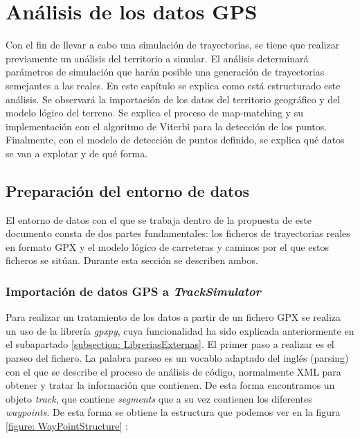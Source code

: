\chapter{Análisis de los datos \ac{GPS}} 
Con el fin de llevar a cabo una simulación de trayectorias, se tiene que realizar previamente
un análisis del territorio a simular. El análisis determinará parámetros de simulación que 
harán posible una generación de trayectorias semejantes a las reales. En este capítulo 
se explica como está estructurado este análisis. Se observará la importación de los datos
del territorio geográfico y del modelo lógico del terreno. Se explica el proceso de 
map-matching y su implementación con el algoritmo de Viterbi para la detección de los 
puntos. Finalmente, con el modelo de detección de puntos definido, se explica qué 
datos se van a explotar y de qué forma.


\section{Preparación del entorno de datos}
El entorno de datos con el que se trabaja dentro de la propuesta de este documento 
consta de dos partes fundamentales: los ficheros de trayectorias reales en formato
\ac{GPX} y el modelo lógico de carreteras y caminos por el que estos ficheros 
se sitúan. Durante esta sección se describen ambos.

\subsection{Importación de datos GPS a \textit{TrackSimulator}}
\label{section: ImportacionGPX}
Para realizar un tratamiento de los datos a partir de un fichero GPX se realiza un uso de la 
librería \textit{gpxpy}, cuya funcionalidad ha sido explicada anteriormente en el subapartado 
\ref{subsection: LibreriasExternas}. El primer paso a realizar es el parseo del fichero. 
La palabra parseo es un vocablo adaptado del inglés (parsing) con el que se describe el proceso 
de análisis de código, normalmente XML para obtener y tratar la información que contienen.
De esta forma encontramos un objeto \textit{track}, que contiene \textit{segments} que a su vez 
contienen los diferentes \textit{waypoints}. De esta
forma se obtiene la estructura que podemos ver en la figura \ref{figure: WayPointStructure} :

